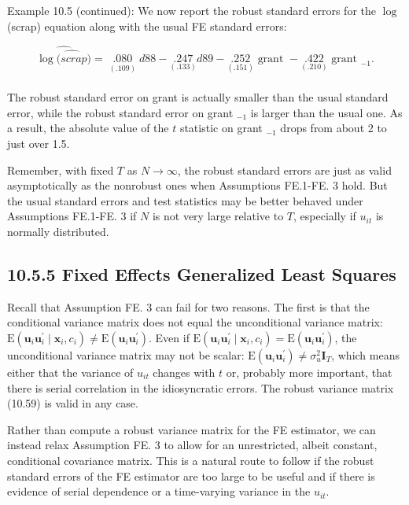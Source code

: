 \documentclass[10pt]{article}
\begin{document}
Example 10.5 (continued): We now report the robust standard errors for the $\log$ (scrap) equation along with the usual FE standard errors:

$$
\widehat{\log \widehat{(s c r a p})}=\underset{\substack{(.109) \\[.096]}}{.080} d 88-\underset{(.133)}{.247} d 89-\underset{(.151)}{.252} \text { grant }-\underset{(.210)}{.422} \text { grant }_{-1} .
$$

The robust standard error on grant is actually smaller than the usual standard error, while the robust standard error on grant $_{-1}$ is larger than the usual one. As a result, the absolute value of the $t$ statistic on grant $_{-1}$ drops from about 2 to just over 1.5.

Remember, with fixed $T$ as $N \rightarrow \infty$, the robust standard errors are just as valid asymptotically as the nonrobust ones when Assumptions FE.1-FE. 3 hold. But the usual standard errors and test statistics may be better behaved under Assumptions FE.1-FE. 3 if $N$ is not very large relative to $T$, especially if $u_{i t}$ is normally distributed.

\subsection*{10.5.5 Fixed Effects Generalized Least Squares}
Recall that Assumption FE. 3 can fail for two reasons. The first is that the conditional variance matrix does not equal the unconditional variance matrix: $\mathrm{E}\left(\mathbf{u}_{i} \mathbf{u}_{i}^{\prime} \mid \mathbf{x}_{i}, c_{i}\right) \neq \mathrm{E}\left(\mathbf{u}_{i} \mathbf{u}_{i}^{\prime}\right)$. Even if $\mathrm{E}\left(\mathbf{u}_{i} \mathbf{u}_{i}^{\prime} \mid \mathbf{x}_{i}, c_{i}\right)=\mathrm{E}\left(\mathbf{u}_{i} \mathbf{u}_{i}^{\prime}\right)$, the unconditional variance matrix may not be scalar: $\mathrm{E}\left(\mathbf{u}_{i} \mathbf{u}_{i}^{\prime}\right) \neq \sigma_{u}^{2} \mathbf{I}_{T}$, which means either that the variance of $u_{i t}$ changes with $t$ or, probably more important, that there is serial correlation in the idiosyncratic errors. The robust variance matrix (10.59) is valid in any case.

Rather than compute a robust variance matrix for the FE estimator, we can instead relax Assumption FE. 3 to allow for an unrestricted, albeit constant, conditional covariance matrix. This is a natural route to follow if the robust standard errors of the FE estimator are too large to be useful and if there is evidence of serial dependence or a time-varying variance in the $u_{i t}$.
\end{document}
